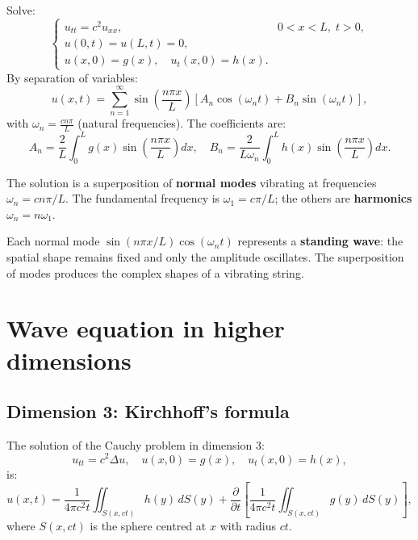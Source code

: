 \begin{example}
Solve:
\[
    \begin{cases}
        u_{tt} = c^2 u_{xx}, & 0 < x < L,\; t > 0,\\
        u(0,t) = u(L,t) = 0,\\
        u(x,0) = g(x), \quad u_t(x,0) = h(x).
    \end{cases}
\]
By separation of variables:
\[
    u(x,t) = \sum_{n=1}^{\infty} \sin\!\left(\frac{n\pi x}{L}\right)
    \left[A_n \cos(\omega_n t) + B_n \sin(\omega_n t)\right],
\]
with $\omega_n = \frac{cn\pi}{L}$ (natural frequencies). The coefficients are:
\[
    A_n = \frac{2}{L}\int_0^L g(x)\sin\!\left(\frac{n\pi x}{L}\right) dx,
    \quad
    B_n = \frac{2}{L\omega_n}\int_0^L h(x)\sin\!\left(\frac{n\pi x}{L}\right) dx.
\]

The solution is a superposition of \textbf{normal modes} vibrating at
frequencies $\omega_n = cn\pi/L$. The fundamental frequency is
$\omega_1 = c\pi/L$; the others are \textbf{harmonics}
$\omega_n = n\omega_1$.
\end{example}

\begin{intuition}
Each normal mode $\sin(n\pi x/L)\cos(\omega_n t)$ represents a
\textbf{standing wave}: the spatial shape remains fixed and only the
amplitude oscillates. The superposition of modes produces the complex
shapes of a vibrating string.
\end{intuition}

\section{Wave equation in higher dimensions}

\subsection{Dimension 3: Kirchhoff's formula}

\begin{theorem}
The solution of the Cauchy problem in dimension 3:
\[
    u_{tt} = c^2 \Delta u, \quad u(x,0) = g(x), \quad u_t(x,0) = h(x),
\]
is:
\begin{equation}\label{eq:kirchhoff}
    u(x,t) = \frac{1}{4\pi c^2 t}\iint_{S(x,ct)} h(y)\, dS(y)
    + \frac{\partial}{\partial t}\left[\frac{1}{4\pi c^2 t}
    \iint_{S(x,ct)} g(y)\, dS(y)\right],
\end{equation}
where $S(x,ct)$ is the sphere centred at $x$ with radius $ct$.
\end{theorem}

